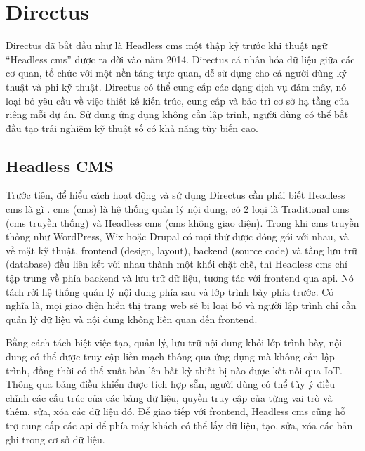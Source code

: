 \documentclass[./../main.tex]{subfiles}
\begin{document}
\section{Directus}
Directus \cite{directus} đã bắt đầu như là Headless \acrshort{cms} một thập kỷ trước khi thuật ngữ “Headless \acrshort{cms}” được ra đời vào năm 2014. Directus cá nhân hóa dữ liệu giữa các cơ quan, tổ chức với một nền tảng trực quan, dễ sử dụng cho cả người dùng kỹ thuật và phi kỹ thuật. Directus có thể cung cấp các dạng dịch vụ đám mây, nó loại bỏ yêu cầu về việc thiết kế kiến trúc, cung cấp và bảo trì cơ sở hạ tầng của riêng mỗi dự án. Sử dụng ứng dụng không cần lập trình, người dùng có thể bắt đầu tạo trải nghiệm kỹ thuật số có khả năng tùy biến cao.

\subsection{Headless CMS}
Trước tiên, để hiểu cách hoạt động và sử dụng Directus cần phải biết Headless \acrshort{cms} là gì \cite{headlesscms}. \acrshort{cms} (\acrlong{cms}) là hệ thống quản lý nội dung, có 2 loại là Traditional \acrshort{cms} (\acrshort{cms} truyền thống) và Headless \acrshort{cms} (\acrshort{cms} không giao diện). Trong khi \acrshort{cms} truyền thống như WordPress, Wix hoặc Drupal có mọi thứ được đóng gói với nhau, và về mặt kỹ thuật, frontend (design, layout), backend (source code) và tầng lưu trữ (database) đều liên kết với nhau thành một khối chặt chẽ, thì Headless \acrshort{cms} chỉ tập trung về phía backend và lưu trữ dữ liệu, tương tác với frontend qua \acrshort{api}. Nó tách rời hệ thống quản lý nội dung phía sau và lớp trình bày phía trước. Có nghĩa là, mọi giao diện hiển thị trang web sẽ bị loại bỏ và người lập trình chỉ cần quản lý dữ liệu và nội dung không liên quan đến frontend.

Bằng cách tách biệt việc tạo, quản lý, lưu trữ nội dung khỏi lớp trình bày, nội dung có thể được truy cập liền mạch thông qua ứng dụng mà không cần lập trình, đồng thời có thể xuất bản lên bất kỳ thiết bị nào được kết nối qua IoT. Thông qua bảng điều khiển được tích hợp sẵn, người dùng có thể tùy ý điều chỉnh các cấu trúc của các bảng dữ liệu, quyền truy cập của từng vai trò và thêm, sửa, xóa các dữ liệu đó. Để giao tiếp với frontend, Headless \acrshort{cms} cũng hỗ trợ cung cấp các \acrshort{api} để phía máy khách có thể lấy dữ liệu, tạo, sửa, xóa các bản ghi trong cơ sở dữ liệu.
\end{document}
